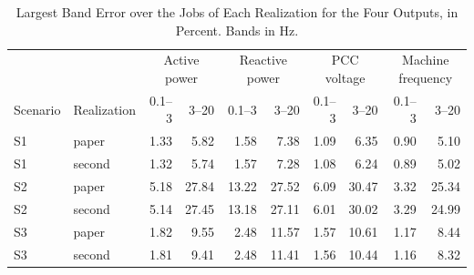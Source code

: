 \begin{table}[H]
\centering\small\setlength{\tabcolsep}{4.5pt}
\caption{Largest Band Error over the Jobs of Each Realization for the Four Outputs, in Percent.
Bands in Hz.}
\label{tab:output-band}
\begin{tabular}{llrrrrrrrr}\toprule
 & & \multicolumn{2}{c}{Active power} & \multicolumn{2}{c}{Reactive power} & \multicolumn{2}{c}{PCC voltage} & \multicolumn{2}{c}{Machine frequency}\\
Scenario & Realization & 0.1--3 & 3--20 & 0.1--3 & 3--20 & 0.1--3 & 3--20 & 0.1--3 & 3--20\\\midrule
S1 & paper & 1.33 & 5.82 & 1.58 & 7.38 & 1.09 & 6.35 & 0.90 & 5.10 \\
S1 & second & 1.32 & 5.74 & 1.57 & 7.28 & 1.08 & 6.24 & 0.89 & 5.02 \\
S2 & paper & 5.18 & 27.84 & 13.22 & 27.52 & 6.09 & 30.47 & 3.32 & 25.34 \\
S2 & second & 5.14 & 27.45 & 13.18 & 27.11 & 6.01 & 30.02 & 3.29 & 24.99 \\
S3 & paper & 1.82 & 9.55 & 2.48 & 11.57 & 1.57 & 10.61 & 1.17 & 8.44 \\
S3 & second & 1.81 & 9.41 & 2.48 & 11.41 & 1.56 & 10.44 & 1.16 & 8.32 \\
\bottomrule\end{tabular}\end{table}
